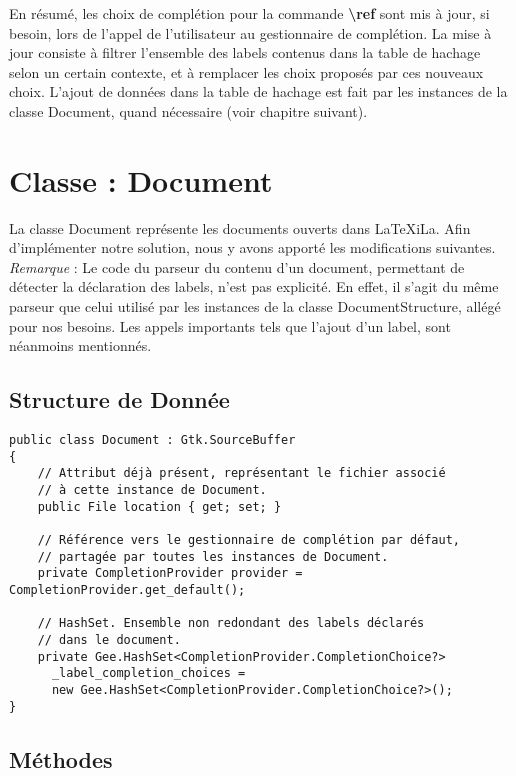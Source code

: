 \documentclass[a4paper,11pt]{report}
\begin{document}
En résumé, les choix de complétion pour la commande \textbf{\textbackslash{}ref} sont mis à jour, si besoin, lors de l'appel de l'utilisateur au gestionnaire de complétion.
La mise à jour consiste à filtrer l'ensemble des labels contenus dans la table de hachage selon un certain contexte, et à remplacer les choix proposés par ces nouveaux choix.
L'ajout de données dans la table de hachage est fait par les instances de la classe Document, quand nécessaire (voir chapitre suivant).

\chapter{Classe : Document}
\label{cha:classe_document}

La classe Document représente les documents ouverts dans LaTeXiLa.
Afin d'implémenter notre solution, nous y avons apporté les modifications suivantes.
\\\textit{Remarque} : Le code du parseur du contenu d'un document, permettant de détecter la déclaration des labels, n'est pas explicité. En effet, il s'agit du même parseur que celui utilisé par les instances de la classe DocumentStructure, allégé pour nos besoins. Les appels importants tels que l'ajout d'un label, sont néanmoins mentionnés.

\section{Structure de Donnée}
\label{sec:D_structure_de_données}

\begin{lstlisting}[frame=single]
public class Document : Gtk.SourceBuffer
{
    // Attribut déjà présent, représentant le fichier associé
    // à cette instance de Document.
    public File location { get; set; }

    // Référence vers le gestionnaire de complétion par défaut,
    // partagée par toutes les instances de Document.
    private CompletionProvider provider = CompletionProvider.get_default();
    
    // HashSet. Ensemble non redondant des labels déclarés
    // dans le document.
    private Gee.HashSet<CompletionProvider.CompletionChoice?> 
      _label_completion_choices =
      new Gee.HashSet<CompletionProvider.CompletionChoice?>();
}
\end{lstlisting}

\section{Méthodes}
\label{sec:D_méthodes}
\end{document}
